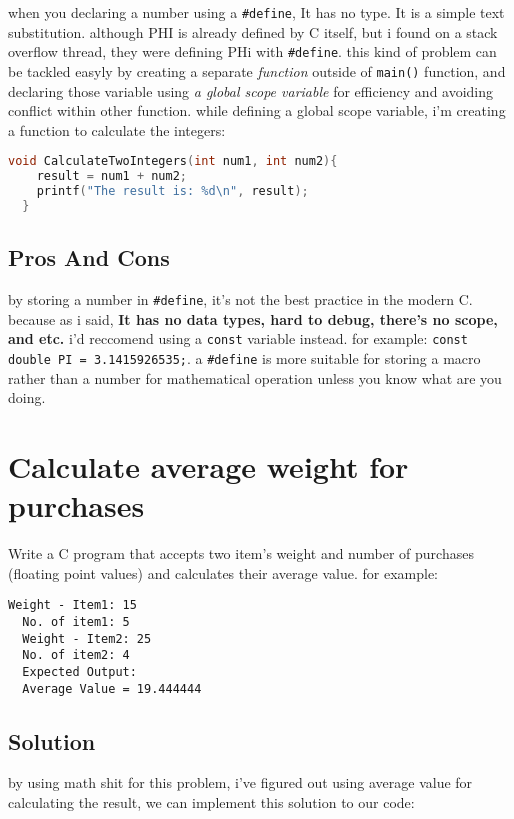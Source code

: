 \documentclass{article}
\begin{document}
  when you declaring a number using a \texttt{\#define}, It has no type. It is a simple text substitution. although PHI is already defined by C itself, but i found on a stack overflow thread, they were defining PHi with \texttt{\#define}.
  this kind of problem can be tackled easyly by creating a separate \textit{function} outside of \texttt{main()} function, and declaring those variable using \textit{a global scope variable} for efficiency and avoiding conflict within other function. 
  while defining a global scope variable, i'm creating a function to calculate the integers:
  \begin{lstlisting}[language=C, caption=function]
  void CalculateTwoIntegers(int num1, int num2){
    result = num1 + num2;
    printf("The result is: %d\n", result);
  }
  \end{lstlisting}

  \subsection{Pros And Cons}
  
  by storing a number in \texttt{\#define}, it's not the best practice in the modern C. because as i said, \textbf{It has no data types, hard to debug, there's no scope, and etc.} 
  i'd reccomend using a \texttt{const} variable instead. for example: \texttt{const double PI = 3.1415926535;}. a \texttt{\#define} is more suitable for storing a macro rather than a number for mathematical operation unless you know what are you doing.
  
  \section{Calculate average weight for purchases} 
  
  Write a C program that accepts two item's weight and number of purchases (floating point values) and calculates their average value.
  for example: 
  
  \begin{lstlisting}[style=plainstyle]
  Weight - Item1: 15
  No. of item1: 5
  Weight - Item2: 25
  No. of item2: 4
  Expected Output:
  Average Value = 19.444444
  \end{lstlisting}
  
  \subsection{Solution}
  
  by using math shit for this problem, i've figured out using average value for calculating the result, we can implement this solution to our code:
  
\end{document}
